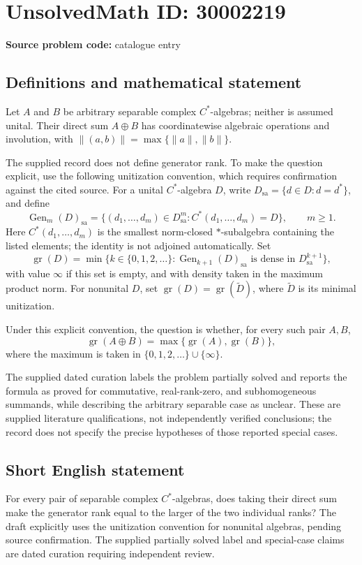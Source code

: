 \documentclass[11pt]{article}
\begin{document}
\section*{UnsolvedMath ID: 30002219}
\textbf{Source problem code:} catalogue entry
\subsection{Definitions and mathematical statement}
Let \(A\) and \(B\) be arbitrary separable complex \(C^*\)-algebras; neither is assumed unital. Their direct sum \(A\oplus B\) has coordinatewise algebraic operations and involution, with \(\|(a,b)\|=\max\{\|a\|,\|b\|\}\).

The supplied record does not define generator rank. To make the question explicit, use the following unitization convention, which requires confirmation against the cited source. For a unital \(C^*\)-algebra \(D\), write \(D_{\mathrm{sa}}=\{d\in D:d=d^*\}\), and define
\[
\operatorname{Gen}_{m}(D)_{\mathrm{sa}}=\{(d_1,\ldots,d_m)\in D_{\mathrm{sa}}^m:C^*(d_1,\ldots,d_m)=D\},\qquad m\geq 1.
\]
Here \(C^*(d_1,\ldots,d_m)\) is the smallest norm-closed \(*\)-subalgebra containing the listed elements; the identity is not adjoined automatically. Set
\[
\operatorname{gr}(D)=\min\bigl\{k\in\{0,1,2,\ldots\}:\operatorname{Gen}_{k+1}(D)_{\mathrm{sa}}\text{ is dense in }D_{\mathrm{sa}}^{k+1}\bigr\},
\]
with value \(\infty\) if this set is empty, and with density taken in the maximum product norm. For nonunital \(D\), set \(\operatorname{gr}(D)=\operatorname{gr}(\widetilde D)\), where \(\widetilde D\) is its minimal unitization.

Under this explicit convention, the question is whether, for every such pair \(A,B\),
\[
\operatorname{gr}(A\oplus B)=\max\{\operatorname{gr}(A),\operatorname{gr}(B)\},
\]
where the maximum is taken in \(\{0,1,2,\ldots\}\cup\{\infty\}\).

The supplied dated curation labels the problem partially solved and reports the formula as proved for commutative, real-rank-zero, and subhomogeneous summands, while describing the arbitrary separable case as unclear. These are supplied literature qualifications, not independently verified conclusions; the record does not specify the precise hypotheses of those reported special cases.
\subsection{Short English statement}
For every pair of separable complex \(C^*\)-algebras, does taking their direct sum make the generator rank equal to the larger of the two individual ranks? The draft explicitly uses the unitization convention for nonunital algebras, pending source confirmation. The supplied partially solved label and special-case claims are dated curation requiring independent review.
\end{document}
